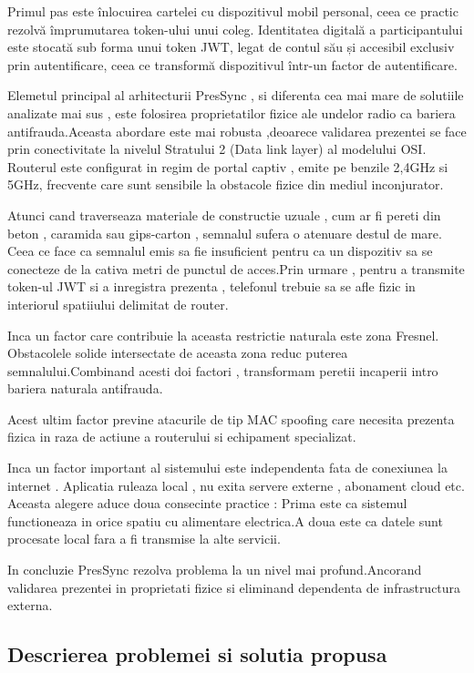 \documentclass[11pt]{article}
\begin{document}
Primul pas este înlocuirea cartelei cu dispozitivul mobil personal, ceea ce practic rezolvă împrumutarea token-ului unui coleg. Identitatea digitală a participantului este stocată sub forma unui token JWT, legat de contul său și accesibil exclusiv prin autentificare, ceea ce transformă dispozitivul într-un factor de autentificare.

Elemetul principal al arhitecturii PresSync , si diferenta cea mai mare de solutiile analizate mai sus , este folosirea proprietatilor fizice ale undelor radio ca bariera antifrauda.Aceasta abordare este mai robusta ,deoarece validarea prezentei se face prin conectivitate la nivelul Stratului 2 (Data link layer) al modelului OSI. Routerul este configurat in regim de portal captiv , emite pe benzile 2,4GHz si 5GHz, frecvente care sunt sensibile la obstacole fizice din mediul inconjurator.

Atunci cand traverseaza materiale de constructie uzuale , cum ar fi pereti din beton , caramida sau gips-carton , semnalul sufera o atenuare destul de mare.
Ceea ce face ca semnalul emis sa fie insuficient pentru ca un dispozitiv sa se conecteze de la cativa metri de punctul de acces.Prin urmare , pentru a transmite token-ul JWT si a inregistra prezenta , telefonul trebuie sa se afle fizic in interiorul spatiiului delimitat de router.

Inca un factor care contribuie la aceasta restrictie naturala este zona Fresnel. Obstacolele solide intersectate de aceasta zona reduc puterea semnalului.Combinand acesti doi factori , transformam peretii incaperii intro bariera naturala antifrauda.

Acest ultim factor previne atacurile de tip MAC spoofing care necesita prezenta fizica in raza de actiune a routerului si echipament specializat.

Inca un factor important al sistemului este independenta fata de conexiunea la internet . Aplicatia ruleaza local , nu exita servere externe , abonament cloud etc.
Aceasta alegere aduce doua consecinte practice : Prima este ca sistemul functioneaza in orice spatiu cu alimentare electrica.A doua este ca datele sunt procesate local fara a fi transmise la alte servicii.

In concluzie PresSync rezolva problema la un nivel mai profund.Ancorand validarea prezentei in proprietati fizice si eliminand dependenta de infrastructura externa.

\subsection{Descrierea problemei si solutia propusa}
\end{document}
